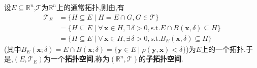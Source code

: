 \documentclass[../../main.tex]{subfiles}%
\begin{document}
\begin{definition}
设$E\subseteq\mathbb{R}^n$,$\mathscr{T}$为$\mathbb{R}^n$上的通常拓扑,则由,有
\begin{align*}
\mathscr{T}_E&=\{H\subseteq E\mid H=E\cap G,G\in\mathscr{T}\}\\
&=\{H\subseteq E\mid \forall\,\boldsymbol{x}\in H,\exists\,\delta>0,\text{s.t.}E\cap B(\boldsymbol{x},\delta)\subseteq H\}\\
&=\{H\subseteq E\mid \forall\,\boldsymbol{x}\in H,\exists\,\delta>0,\text{s.t.}B_E(\boldsymbol{x},\delta)\subseteq H\}
\end{align*}
(其中$B_E(\boldsymbol{x};\delta)=E\cap B(\boldsymbol{x};\delta)=\{\boldsymbol{y}\in E\mid \rho(\boldsymbol{y},\boldsymbol{x})<\delta\}$)为$E$上的一个拓扑.于是,$(E,\mathscr{T}_E)$为一个\textbf{拓扑空间},称为$(\mathbb{R}^n,\mathscr{T})$的\textbf{子拓扑空间}.
\end{definition}
\end{document}
